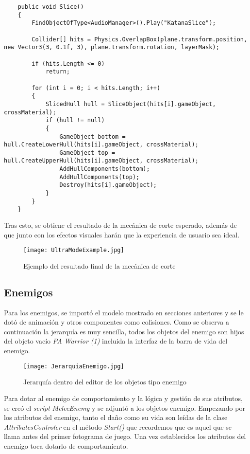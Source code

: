 \begin{lstlisting}
    public void Slice()
    {
        FindObjectOfType<AudioManager>().Play("KatanaSlice");

        Collider[] hits = Physics.OverlapBox(plane.transform.position, new Vector3(3, 0.1f, 3), plane.transform.rotation, layerMask);

        if (hits.Length <= 0)
            return;

        for (int i = 0; i < hits.Length; i++)
        {
            SlicedHull hull = SliceObject(hits[i].gameObject, crossMaterial);
            if (hull != null)
            {
                GameObject bottom = hull.CreateLowerHull(hits[i].gameObject, crossMaterial);
                GameObject top = hull.CreateUpperHull(hits[i].gameObject, crossMaterial);
                AddHullComponents(bottom);
                AddHullComponents(top);
                Destroy(hits[i].gameObject);
            }
        }
    }
\end{lstlisting}

Tras esto, se obtiene el resultado de la mecánica de corte esperado, además de que junto con los efectos visuales harán que la experiencia de usuario sea ideal.

\begin{figure}[H]
    \centering
    \texttt{[image: UltraModeExample.jpg]}
    \caption{Ejemplo del resultado final de la mecánica de corte}
\end{figure}

\subsection{Enemigos}

Para los enemigos, se importó el modelo mostrado en secciones anteriores y se le dotó de animación y otros componentes como colisiones. Como se observa a continuación la jerarquía es muy sencilla, todos los objetos del enemigo son hijos del objeto vacío \textit{PA Warrior (1)} incluida la interfaz de la barra de vida del enemigo.

\begin{figure}[H]
    \centering
    \texttt{[image: JerarquiaEnemigo.jpg]}
    \caption{Jerarquía dentro del editor de los objetos tipo enemigo}
\end{figure}

Para dotar al enemigo de comportamiento y la lógica y gestión de sus atributos, se creó el \textit{script} \textit{MeleeEnemy} y se adjuntó a los objetos enemigo. Empezando por los atributos del enemigo, tanto el daño como su vida son leídas de la clase \textit{AttributesControler} en el método \textit{Start()} que recordemos que es aquel que se llama antes del primer fotograma de juego. Una vez establecidos los atributos del enemigo toca dotarlo de comportamiento.

